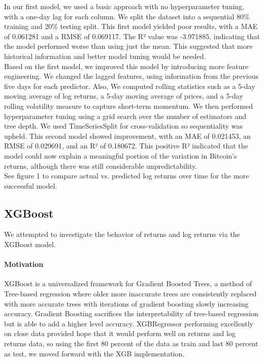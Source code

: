 \documentclass{article}
\begin{document}
In our first model, we used a basic approach with no hyperparameter tuning, with a one-day lag for each column. We split the dataset into a sequential 80\% training and 20\% testing split. This first model yielded poor results, with a MAE of 0.061281 and a RMSE of 0.069117. The R² value was -3.971885, indicating that the model performed worse than using just the mean. This suggested that more historical information and better model tuning would be needed.\\ 

Based on the first model, we improved this model by introducing more feature engineering. We changed the lagged features, using information from the previous five days for each predictor. Also, We computed rolling statistics such as a 5-day moving average of log returns, a 5-day moving average of prices, and a 5-day rolling volatility measure to capture short-term momentum. We then performed hyperparameter tuning using a grid search over the number of estimators and tree depth. We used TimeSeriesSplit for cross-validation so sequentiality was upheld. This second model showed improvement, with an MAE of 0.021453, an RMSE of 0.029691, and an R² of 0.180672. This positive R² indicated that the model could now explain a meaningful portion of the variation in Bitcoin’s returns, although there was still considerable unpredictability. \\


See figure 1 to compare actual vs. predicted log returns over time for the more successful model.

\subsection{XGBoost}
We attempted to investigate the behavior of returns and log returns via the XGBoost model.

\paragraph{Motivation}
XGBoost is a universalized framework for Gradient Boosted Trees, a method of Tree-based regression where older more inaccurate trees are consistently replaced with more accurate trees with iterations of gradient boosting slowly increasing accuracy. Gradient Boosting sacrifices the interpretability of tree-based regression but is able to add a higher level accuracy. XGBRegressor performing excellently on close data provided hope that it would perform well on returns and log returns data, so using the first 80 percent of the data as train and last 80 percent as test, we moved forward with the XGB implementation.
\end{document}
